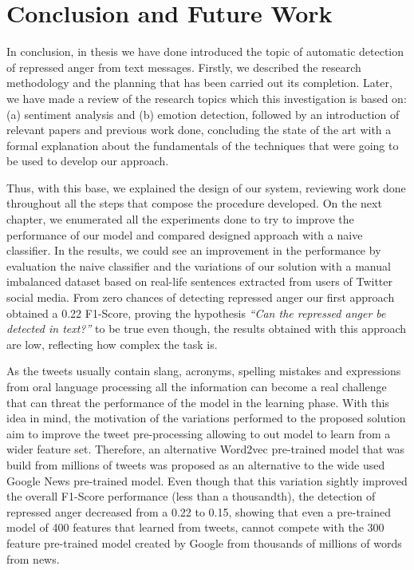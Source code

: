 \chapter{Conclusion and Future Work}

In conclusion, in thesis we have done introduced the topic of automatic detection of repressed anger from text messages. Firstly, we described the research methodology and the planning that has been carried out its completion. Later, we have made a review of the research topics which this investigation is based on: (a) sentiment analysis and (b) emotion detection, followed by an introduction of relevant papers and previous work done, concluding the state of the art with a formal explanation about the fundamentals of the techniques that were going to be used to develop our approach.

Thus, with this base, we explained the design of our system, reviewing work done throughout all the steps that compose the procedure developed. On the next chapter, we enumerated all the experiments done to try to improve the performance of our model and compared designed approach with a naive classifier. In the results, we could see an improvement in the performance by evaluation the naive classifier and the variations of our solution with a manual imbalanced dataset based on real-life sentences extracted from users of Twitter social media. From zero chances of detecting repressed anger our first approach obtained a 0.22 F1-Score, proving the hypothesis \textit{``Can the repressed anger be detected in text?''} to be true even though, the results obtained with this approach are low, reflecting how complex the task is.

As the tweets usually contain slang, acronyms, spelling mistakes and expressions from oral language processing all the information can become a real challenge that can threat the performance of the model in the learning phase. With this idea in mind, the motivation of the variations performed to the proposed solution aim to improve the tweet pre-processing allowing to out model to learn from a wider feature set. Therefore, an alternative Word2vec pre-trained model that was build from millions of tweets was proposed as an alternative to the wide used Google News pre-trained model. Even though that this variation sightly improved the overall F1-Score performance (less than a thousandth), the detection of repressed anger decreased from a 0.22 to 0.15, showing that even a pre-trained model of 400 features that learned from tweets, cannot compete with the 300 feature pre-trained model created by Google from thousands of millions of words from news.

